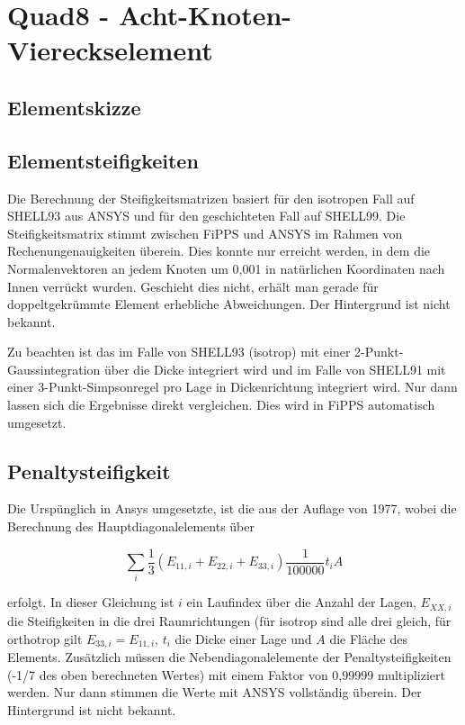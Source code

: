 \documentclass[11pt,titlepage,listof=totoc,bibliography=totoc,twoside]{scrreprt}
\begin{document}
\section{Quad8 - Acht-Knoten-Viereckselement}

\subsection{Elementskizze}

\subsection{Elementsteifigkeiten}

Die Berechnung der Steifigkeitsmatrizen basiert für den isotropen Fall auf SHELL93 aus ANSYS und für den geschichteten Fall auf SHELL99. Die Steifigkeitsmatrix stimmt zwischen FiPPS und ANSYS im Rahmen von Rechenungenauigkeiten überein. Dies konnte nur erreicht werden, in dem die Normalenvektoren an jedem Knoten um 0,001 in natürlichen Koordinaten nach Innen verrückt wurden. Geschieht dies nicht, erhält man gerade für doppeltgekrümmte Element erhebliche Abweichungen.  Der Hintergrund ist nicht bekannt. 

Zu beachten ist das im Falle von SHELL93 (isotrop) mit einer 2-Punkt-Gaussintegration über die Dicke integriert wird und im Falle von SHELL91 mit einer 3-Punkt-Simpsonregel pro Lage in Dickenrichtung integriert wird. Nur dann lassen sich die Ergebnisse direkt vergleichen. Dies wird in FiPPS automatisch umgesetzt.

\subsection{Penaltysteifigkeit}

Die Urspünglich in Ansys umgesetzte, ist die aus der Auflage von 1977, wobei die Berechnung des Hauptdiagonalelements über

\begin{equation*}
 \sum_{i} \frac{1}{3}\left( E_{11,i} + E_{22,i} + E_{33,i} \right) \frac{1}{100000} t_i A
\end{equation*}

erfolgt. In dieser Gleichung ist $i$ ein Laufindex über die Anzahl der Lagen, $E_{XX,i}$ die Steifigkeiten in die drei Raumrichtungen (für isotrop sind alle drei gleich, für orthotrop gilt $E_{33,i} = E_{11,i}$, $t_i$ die Dicke einer Lage und $A$ die Fläche des Elements. Zusätzlich müssen die Nebendiagonalelemente der Penaltysteifigkeiten (-1/7 des oben berechneten Wertes) mit einem Faktor von 0,99999 multipliziert werden. Nur dann stimmen die Werte mit ANSYS vollständig überein. Der Hintergrund ist nicht bekannt.
\end{document}
